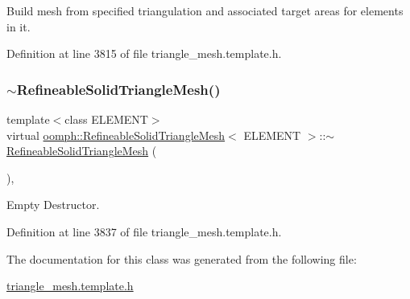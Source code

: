 Build mesh from specified triangulation and associated target areas for elements in it. 



Definition at line 3815 of file triangle\+\_\+mesh.\+template.\+h.

\mbox{\label{classoomph_1_1RefineableSolidTriangleMesh_a8b4ea32b78a6f80536dba20538452e7b}} 
\subsubsection{\texorpdfstring{$\sim$\+Refineable\+Solid\+Triangle\+Mesh()}{~RefineableSolidTriangleMesh()}}
{\footnotesize\ttfamily template$<$class E\+L\+E\+M\+E\+NT$>$ \\
virtual \hyperlink{classoomph_1_1RefineableSolidTriangleMesh}{oomph\+::\+Refineable\+Solid\+Triangle\+Mesh}$<$ E\+L\+E\+M\+E\+NT $>$\+::$\sim$\hyperlink{classoomph_1_1RefineableSolidTriangleMesh}{Refineable\+Solid\+Triangle\+Mesh} (\begin{DoxyParamCaption}{ }\end{DoxyParamCaption})\hspace{0.3cm}{\ttfamily [inline]}, {\ttfamily [virtual]}}



Empty Destructor. 



Definition at line 3837 of file triangle\+\_\+mesh.\+template.\+h.



The documentation for this class was generated from the following file\+:\begin{DoxyCompactItemize}
\item 
\hyperlink{triangle__mesh_8template_8h}{triangle\+\_\+mesh.\+template.\+h}\end{DoxyCompactItemize}
